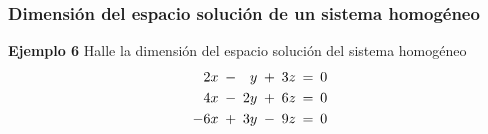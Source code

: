 \begin{frame}\frametitle{Dimensión del espacio solución de un sistema homogéneo}



\begin{ej}{\textbf{Ejemplo 6}} \justifying
	Halle la dimensión del espacio solución del sistema homogéneo
	\[	
	\begin{array}{r@{\hspace{0.8\tabcolsep}}c@{\hspace{0.8\tabcolsep}}r@{\hspace{0.8\tabcolsep}}c@{\hspace{0.8\tabcolsep}}r@{\hspace{0.8\tabcolsep}}c@{\hspace{0.8\tabcolsep}}l@{\hspace{0.8\tabcolsep}}} 
	2x & - & y & + & 3z & = & 0 \\[1mm] 
	4x & - & 2y & + & 6z & = & 0 \\[1mm] 
	-6x & + & 3y & - & 9z & = & 0 
	\end{array}
	\]
\end{ej}	

\end{frame}

